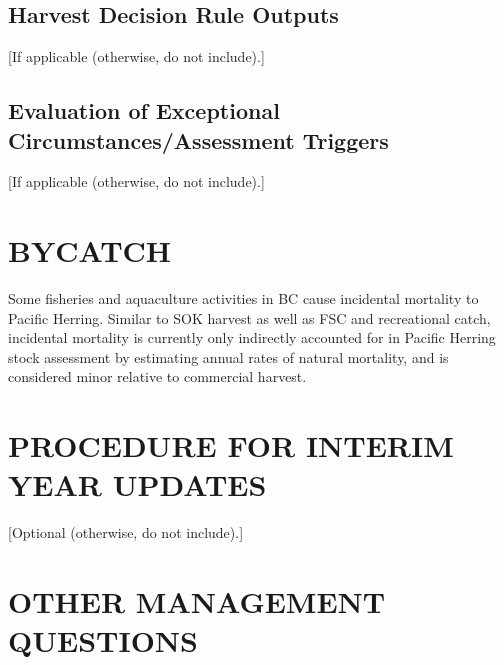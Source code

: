 \documentclass[11pt]{book}
\begin{document}
\hypertarget{harvest-decision-rule-outputs}{%
\subsection*{Harvest Decision Rule Outputs}\label{harvest-decision-rule-outputs}}

{[}If applicable (otherwise, do not include).{]}

\hypertarget{evaluation-of-exceptional-circumstancesassessment-triggers}{%
\subsection*{Evaluation of Exceptional Circumstances/Assessment Triggers}\label{evaluation-of-exceptional-circumstancesassessment-triggers}}

{[}If applicable (otherwise, do not include).{]}

\hypertarget{bycatch}{%
\section*{BYCATCH}\label{bycatch}}

Some fisheries and aquaculture activities in BC cause incidental mortality to Pacific Herring. Similar to SOK harvest as well as FSC and recreational catch, incidental mortality is currently only indirectly accounted for in Pacific Herring stock assessment by estimating annual rates of natural mortality, and is considered minor relative to commercial harvest.

\hypertarget{procedure-for-interim-year-updates}{%
\section*{PROCEDURE FOR INTERIM YEAR UPDATES}\label{procedure-for-interim-year-updates}}

{[}Optional (otherwise, do not include).{]}

\hypertarget{other-management-questions}{%
\section*{OTHER MANAGEMENT QUESTIONS}\label{other-management-questions}}
\end{document}
